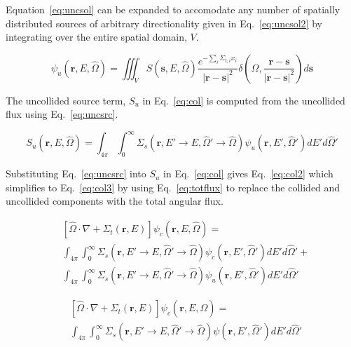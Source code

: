 Equation~\ref{eq:uncsol} can be expanded to accomodate any number of spatially distributed sources of arbitrary directionality given in Eq.~\ref{eq:uncsol2} by integrating over the entire spatial domain, $V$.

\begin{equation} \label{eq:uncsol2}
\psi_u(\boldsymbol{r}, E, \hat{\Omega}) = \iiint_{V}
S(\boldsymbol{s}, E, \hat{\Omega})
\frac{e^{-\sum_i \Sigma_{t,i} x_i}}{|\boldsymbol{r}-\boldsymbol{s}|^2}
\delta\left( \hat{\Omega}, \frac{\boldsymbol{r}-\boldsymbol{s}}{|\boldsymbol{r}-\boldsymbol{s}|^2}\right)
d \boldsymbol{s}
\end{equation}

The uncollided source term, $S_u$ in Eq.~\ref{eq:col} is computed from the uncollided flux using Eq.~\ref{eq:uncsrc}.

\begin{equation} \label{eq:uncsrc}
S_u(\boldsymbol{r}, E, \hat{\Omega}) = \int_{4\pi} \int_{0}^{\infty} 
\Sigma_s(\boldsymbol{r}, E' \rightarrow E, \hat{\Omega}' \rightarrow \hat{\Omega}) \psi_u(\boldsymbol{r}, E', \hat{\Omega}') 
dE' d\hat{\Omega}'
\end{equation}

Substituting Eq.~\ref{eq:uncsrc} into $S_u$ in Eq.~\ref{eq:col} gives Eq.~\ref{eq:col2} which simplifies to Eq.~\ref{eq:col3} by using Eq.~\ref{eq:totflux} to replace the collided and uncollided components with the total angular flux.

\begin{equation} \label{eq:col2}
\begin{split}
	&\left[ \hat{\Omega} \cdot \nabla + \Sigma_t(\boldsymbol{r}, E) \right]
	\psi_c(\boldsymbol{r}, E, \hat{\Omega}) = \\
	&\int_{4 \pi} \int_0^\infty \Sigma_s(\boldsymbol{r}, E' \rightarrow E, \hat{\Omega}' \rightarrow \hat{\Omega}) \psi_c(\boldsymbol{r}, E', \hat{\Omega}') dE' d\hat{\Omega}' + \\
	&\int_{4\pi} \int_{0}^{\infty} 
\Sigma_s(\boldsymbol{r}, E' \rightarrow E, \hat{\Omega}' \rightarrow \hat{\Omega}) \psi_u(\boldsymbol{r}, E', \hat{\Omega}') 
dE' d\hat{\Omega}'
\end{split}
\end{equation}

\begin{equation} \label{eq:col3}
\begin{split}
	&\left[ \hat{\Omega} \cdot \nabla + \Sigma_t(\boldsymbol{r}, E) \right]
	\psi_c(\boldsymbol{r}, E, \hat{\Omega}) = \\
	&\int_{4 \pi} \int_0^\infty \Sigma_s(\boldsymbol{r}, E' \rightarrow E, \hat{\Omega}' \rightarrow \hat{\Omega}) \psi(\boldsymbol{r}, E', \hat{\Omega}') dE' d\hat{\Omega}'
\end{split}
\end{equation}

